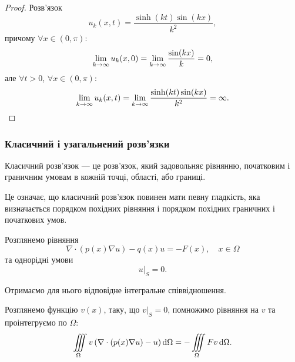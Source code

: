 \begin{proof}
    Розв'язок
    \begin{equation}
        u_k(x, t) = \frac{\sinh(k t) \sin (k x)}{k^2},
    \end{equation}
    причому $\forall x \in (0, \pi)$:
    \begin{equation}
        \displaystyle\lim\limits_{k \to \infty} u_k(x, 0) =  \displaystyle\lim\limits_{k \to \infty} \frac{\sin (k x)}{k} = 0,
    \end{equation}
    але $\forall t > 0$, $\forall x \in (0, \pi)$:
    \begin{equation}
        \displaystyle\lim\limits_{k \to \infty} u_k(x, t) =  \displaystyle\lim\limits_{k \to \infty} \frac{\sinh(k t) \sin (k x)}{k^2} = \infty.
    \end{equation}
\end{proof}

\subsubsection{Класичний і узагальнений розв'язки}

\begin{definition}
    Класичний розв'язок --- це розв'язок, який задовольняє рівнянню, початковим і граничним умовам в кожній точці, області, або границі.    
\end{definition}

Це означає, що класичний розв'язок повинен мати певну гладкість, яка визначається порядком похідних рівняння і порядком похідних граничних і початкових умов. \medskip

Розглянемо рівняння
\begin{equation}
    \label{eq:differential-equation}
    \nabla \cdot (p(x) \nabla u) - q(x) u = -F (x), \quad x \in \Omega
\end{equation}
та однорідні умови
\begin{equation}
    \label{eq:homogenuous-conditions}
    \left. u \right|_S = 0.
\end{equation}

Отримаємо для нього відповідне інтегральне співвідношення. \medskip

Розглянемо функцію $v(x)$, таку, що $\left. v \right|_S = 0$, помножимо рівняння на $v$ та проінтегруємо по $\Omega$:
\begin{equation}
    \displaystyle\iiint\limits_\Omega v \left(\nabla \cdot (p(x) \nabla u) - u \right) \mathop{}\!\mathrm{d} \Omega = - \displaystyle\iiint\limits_\Omega F v \mathop{}\!\mathrm{d} \Omega.    
\end{equation}

